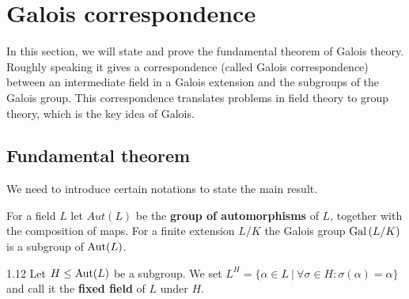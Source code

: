 \documentclass[twoside = false,	%
		headsepline,		%
		parskip = true,
		]{scrbook}						%
\begin{document}
\section{Galois correspondence}
        In this section, we will state and prove the fundamental theorem of Galois theory. Roughly speaking it gives a correspondence (called Galois correspondence) between an intermediate field in a Galois extension and the subgroups of the Galois group. This correspondence translates problems in field theory to group theory, which is the key idea of Galois.
    
    \subsection{Fundamental theorem}
        We need to introduce certain notations to state the main result.
        
        For a field $L$ let $Aut(L)$ be the \textbf{group of automorphisms} of $L$, together with the composition of maps. For a finite extension $L/K$ the Galois group $\mathrm{Gal}\left( L/K\right)$ is a subgroup of $\mathrm{Aut}(L)$.
        
        \begin{definition}{}{1.12}
            Let $H \leq \mathrm{Aut}(L)$ be a subgroup. We set $L^H = \{\alpha \in L \ | \ \forall \sigma \in H: \sigma(\alpha) = \alpha \}$ and call it the \textbf{fixed field} of $L$ under $H$.
        \end{definition}
        
\end{document}
